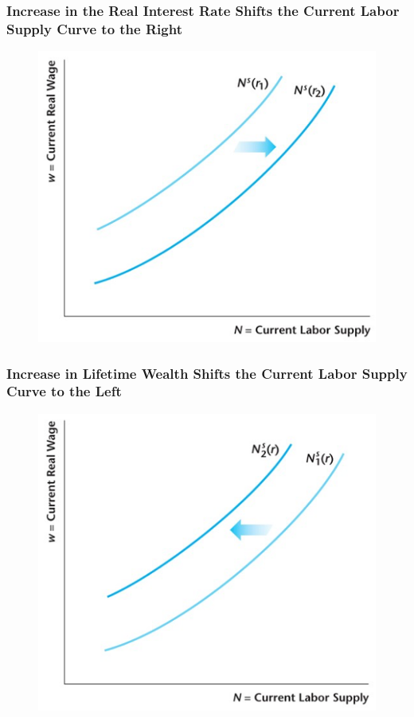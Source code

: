 \documentclass{beamer}
\begin{document}
\begin{frame}
\frametitle[alignment=center]{Increase in the Real Interest Rate Shifts the Current Labor Supply Curve to the Right}
\begin{figure}
\centering
\includegraphics[scale=0.6]{Figures/W_Fig_11pt2.png}
\end{figure}
\end{frame}

\begin{frame}
\frametitle[alignment=center]{Increase in Lifetime Wealth Shifts the Current Labor Supply Curve to the Left}
\begin{figure}
\centering
\includegraphics[scale=0.6]{Figures/W_Fig_11pt3.png}
\end{figure}
\end{frame}
\end{document}
